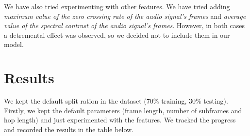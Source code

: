 \documentclass{article}
\begin{document}
We have also tried experimenting with other features. We have tried adding \textit{maximum value of the zero crossing rate of the audio signal’s frames} and \textit{average value of the spectral contrast of the audio signal’s frames}. However, in both cases a detremental effect was observed, so we decided not to include them in our model.


\section*{Results}
We kept the default split ration in the dataset (70\% training, 30\% testing). Firstly, we kept the default parameters (frame length, number of subframes and hop length) and just experimented with the features. We tracked the progress and recorded the results in the table below.
\end{document}
